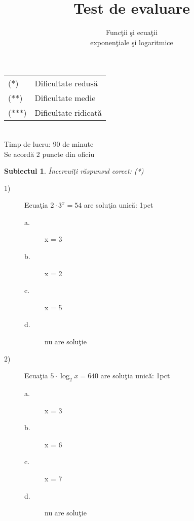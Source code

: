 \documentclass[a4paper, 12pt]{scrartcl}
\title{
    Test de evaluare
}
\subtitle{Func\c tii \c si ecua\c tii \\
exponen\c tiale \c si logaritmice}
\author{}
\date{}
\theoremstyle{plain}
\newtheorem{subiect}{Subiectul}
\newcommand{\Subiect}[1]{
    {
        \large
        \begin{subiect}
            #1
        \end{subiect}
    }
}
\begin{document}
\maketitle

\begin{tabular}{l l}
    (*)   & Dificultate redus\u a \hfill \\
    (**)  & Dificultate medie  \\
    (***) & Dificultate ridicat\u a \\
\end{tabular} \\
\indent Timp de lucru: 90 de minute \\
\indent Se acord\u a 2 puncte din oficiu \\

\Subiect{\^ Incercui\c ti r\u aspunsul corect: \hfill (*)}

\begin{description}
    \item[1)] Ecua\c tia \(2 \cdot 3^x = 54 \) are solu\c tia unic\u a: \hfill 1pct
    {
        \begin{paracol}{3}
            \begin{description}
                \item[a.] x = 3 
                \item[b.] x = 2 
            \end{description}
            \switchcolumn
            \begin{description}
                \item[c.] x = 5
                \item[d.] nu are solu\c tie 
            \end{description}
            \switchcolumn
        \end{paracol}
    }
    \item[2)] Ecua\c tia \(5 \cdot \log_2{x} = 640 \) are solu\c tia unic\u a: \hfill 1pct
    {
        \begin{paracol}{3}
            \begin{description}
                \item[a.] x = 3 
                \item[b.] x = 6 
            \end{description}
            \switchcolumn
            \begin{description}
                \item[c.] x = 7
                \item[d.]nu are solu\c tie 
            \end{description}
            \switchcolumn
        \end{paracol}
    }
\end{description}
\end{document}
